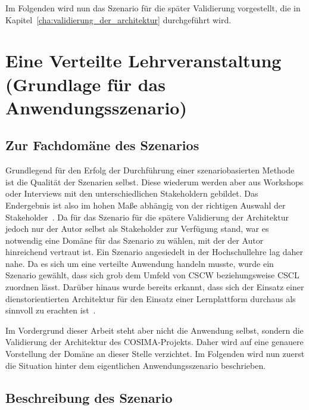   
  Im Folgenden wird nun das Szenario für die später Validierung vorgestellt, die in Kapitel~\ref{cha:validierung_der_architektur} durchgeführt wird.
  

\section{Eine Verteilte Lehrveranstaltung (Grundlage für das Anwendungsszenario)} %
\label{sec:hochschulszenario}

\subsection{Zur Fachdomäne des Szenarios} %
\label{sub:zur_fachdomaene_des_szenarios}

  Grundlegend für den Erfolg der Durchführung einer szenariobasierten Methode ist die Qualität der Szenarien selbst. Diese wiederum werden aber aus Workshops oder Interviews mit den unterschiedlichen Stakeholdern gebildet. Das Endergebnis ist also im hohen Maße abhängig von der richtigen Auswahl der Stakeholder~\citep[S. 187]{evaluating_software_architectures}. Da für das Szenario für die spätere Validierung der Architektur jedoch nur der Autor selbst als Stakeholder zur Verfügung stand, war es notwendig eine Domäne für das Szenario zu wählen, mit der der Autor hinreichend vertraut ist. Ein Szenario angesiedelt in der Hochschullehre lag daher nahe. Da es sich um eine verteilte Anwendung handeln musste, wurde ein Szenario gewählt, dass sich grob dem Umfeld von CSCW beziehungsweise CSCL zuordnen lässt. Darüber hinaus wurde bereits erkannt, dass sich der Einsatz einer dienstorientierten Architektur für den Einsatz einer Lernplattform durchaus als sinnvoll zu erachten ist~\citep{campus_source}.
  
  Im Vordergrund dieser Arbeit steht aber nicht die Anwendung selbst, sondern die Validierung der Architektur des COSIMA-Projekts. Daher wird auf eine genauere Vorstellung der Domäne an dieser Stelle verzichtet. Im Folgenden wird nun zuerst die Situation hinter dem eigentlichen Anwendungsszenario beschrieben.


\subsection{Beschreibung des Szenario} %
\label{sub:beschreibung_des_szenario}

